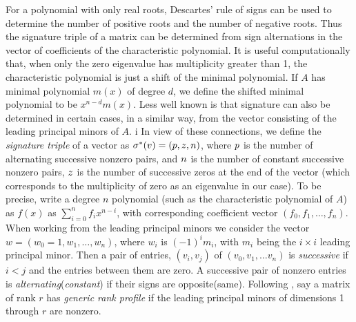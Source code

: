 \documentclass{acm_proc_article-sp}
\begin{document}
For a polynomial with only real roots, Descartes' rule of signs can be used to 
determine the number of positive roots and the number of negative roots.
Thus the signature triple of a matrix can be determined from sign alternations
in 
the vector of coefficients of the characteristic polynomial.  
It is useful
computationally that, when only the zero eigenvalue has multiplicity greater
than 1, the characteristic polynomial is just a shift of the minimal 
polynomial.  If $A$ has minimal polynomial $m(x)$ of degree $d$, we define
the shifted minimal polynomial to be $x^{n-d} m(x)$.  
Less well known
is that signature can also be determined in certain cases, in a similar way, 
from the vector consisting of the leading principal minors of $A$. 
i%
In view of these connections, we define the {\em signature triple} of a 
vector as
$\sigma^{*}(v) = (p, z, n)$, where
$p$ is the number of alternating successive nonzero pairs, and 
$n$ is the number of constant successive nonzero pairs,
$z$ is the number of successive zeros at the end of the vector
(which corresponds to the multiplicity of zero as an eigenvalue in our case).
To be precise, 
write a degree $n$ polynomial (such as the characteristic polynomial of $A$)
as $f(x)$ as $\sum_{i=0}^n f_i x^{n-i}$, with corresponding coefficient
vector $(f_0, f_1, \ldots, f_n)$.
When working from the leading principal minors we consider the vector
$w = (w_0 = 1, w_1, \ldots, w_n)$, where $w_i$ is $(-1)^i m_i$, with $m_i$ being
the $i\times i$ leading principal minor. 
Then a pair of entries, $(v_i, v_j)$ of $(v_0, v_1, \ldots v_n)$ is {\em successive} 
if $i < j$ and the entries between them are zero.
A successive pair of nonzero entries is {\em alternating}({\em constant}) if 
their signs are opposite(same).
Following \cite{KaLo96:issac},
say a matrix of rank $r$ has 
{\em generic rank profile} if the leading principal minors 
of dimensions 1 through $r$ are nonzero. 
\end{document}
